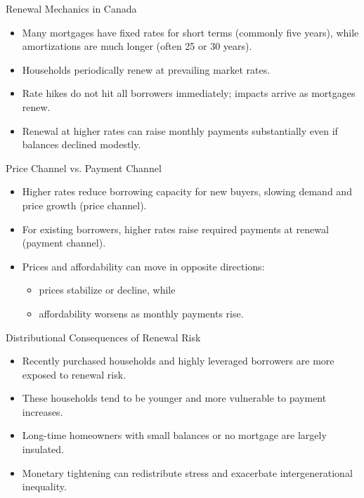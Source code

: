 \documentclass[aspectratio=169]{beamer}
\begin{document}
\begin{frame}{Renewal Mechanics in Canada}
\transfade
\begin{itemize}
  \item Many mortgages have fixed rates for short terms (commonly five years), while amortizations are much longer (often 25 or 30 years).
  \item Households periodically renew at prevailing market rates.
  \item Rate hikes do not hit all borrowers immediately; impacts arrive as mortgages renew.
  \item Renewal at higher rates can raise monthly payments substantially even if balances declined modestly.
\end{itemize}
\end{frame}

\begin{frame}{Price Channel vs. Payment Channel}
\transfade
\begin{itemize}
  \item Higher rates reduce borrowing capacity for new buyers, slowing demand and price growth (price channel).
  \item For existing borrowers, higher rates raise required payments at renewal (payment channel).
  \item Prices and affordability can move in opposite directions:
  \begin{itemize}
    \item prices stabilize or decline, while
    \item affordability worsens as monthly payments rise.
  \end{itemize}
\end{itemize}
\end{frame}



\begin{frame}{Distributional Consequences of Renewal Risk}
\transfade
\begin{itemize}
  \item Recently purchased households and highly leveraged borrowers are more exposed to renewal risk.
  \item These households tend to be younger and more vulnerable to payment increases.
  \item Long-time homeowners with small balances or no mortgage are largely insulated.
  \item Monetary tightening can redistribute stress and exacerbate intergenerational inequality.
\end{itemize}
\end{frame}
\end{document}
